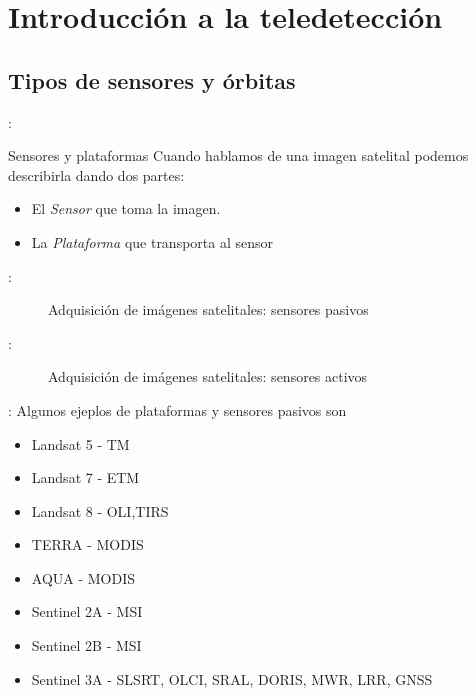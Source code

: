 \section{Introducción a la teledetección}

\subsection{Tipos de sensores y órbitas}

\begin{frame}{\secname : \subsecname}

\begin{block}{Sensores y plataformas}
  Cuando hablamos de una imagen satelital podemos describirla dando dos partes:
  \begin{itemize}
    \item El \emph{Sensor} que toma la imagen.
    \item La \emph{Plataforma} que transporta al sensor
  \end{itemize}
\end{block}

\end{frame}

\begin{frame}{\secname : \subsecname}
  \begin{figure}
    \centering
    \caption{Adquisición de imágenes satelitales: sensores pasivos}
    \label{}
  \end{figure}
\end{frame}

\begin{frame}{\secname : \subsecname}
  \begin{figure}
    \centering
    \caption{Adquisición de imágenes satelitales: sensores activos}
    \label{}
  \end{figure}
\end{frame}

\begin{frame}{\secname : \subsecname}
  Algunos ejeplos de plataformas y sensores pasivos son
  \begin{itemize}
    \item {}   {Landsat 5 - TM}
    \item<3-> Landsat 7 - ETM
    \item<4-> Landsat 8 - OLI,TIRS
    \item<5-> TERRA - MODIS
    \item<5-> AQUA - MODIS
    \item<6-> Sentinel 2A - MSI
    \item<6-> Sentinel 2B - MSI
    \item<7-> Sentinel 3A - SLSRT, OLCI, SRAL, DORIS, MWR, LRR, GNSS
  \end{itemize}
\end{frame}

